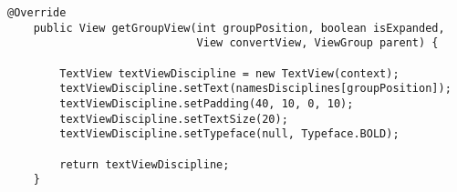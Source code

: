 \begin{lstlisting}[style=custom_JAVA]
@Override
    public View getGroupView(int groupPosition, boolean isExpanded,
                             View convertView, ViewGroup parent) {

        TextView textViewDiscipline = new TextView(context);
        textViewDiscipline.setText(namesDisciplines[groupPosition]);
        textViewDiscipline.setPadding(40, 10, 0, 10);
        textViewDiscipline.setTextSize(20);
        textViewDiscipline.setTypeface(null, Typeface.BOLD);

        return textViewDiscipline;
    }
\end{lstlisting}
